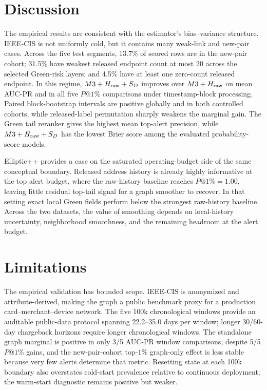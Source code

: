 \documentclass[11pt]{article}
\theoremstyle{definition}
\theoremstyle{remark}
\begin{document}
\section{Discussion}

The empirical results are consistent with the estimator's bias--variance structure. IEEE-CIS is not uniformly cold, but it contains many weak-link and new-pair cases. Across the five test segments, 13.7\% of scored rows are in the new-pair cohort; 31.5\% have weakest released endpoint count at most 20 across the selected Green-risk layers; and 4.5\% have at least one zero-count released endpoint. In this regime, $M3+H_{\rm raw}+S_D$ improves over $M3+H_{\rm raw}$ on mean AUC-PR and in all five $P@1\%$ comparisons under timestamp-block processing. Paired block-bootstrap intervals are positive globally and in both controlled cohorts, while released-label permutation sharply weakens the marginal gain. The Green tail reranker gives the highest mean top-alert precision, while $M3+H_{\rm raw}+S_D$ has the lowest Brier score among the evaluated probability-score models.

Elliptic++ provides a case on the saturated operating-budget side of the same conceptual boundary. Released address history is already highly informative at the top alert budget, where the raw-history baseline reaches $P@1\%=1.00$, leaving little residual top-tail signal for a graph smoother to recover. In that setting exact local Green fields perform below the strongest raw-history baseline. Across the two datasets, the value of smoothing depends on local-history uncertainty, neighborhood smoothness, and the remaining headroom at the alert budget.

\section{Limitations}

The empirical validation has bounded scope. IEEE-CIS is anonymized and attribute-derived, making the graph a public benchmark proxy for a production card--merchant--device network. The five 100k chronological windows provide an auditable public-data protocol spanning 22.2--35.0 days per window; longer 30/60-day chargeback horizons require longer chronological windows. The standalone graph marginal is positive in only 3/5 AUC-PR window comparisons, despite 5/5 $P@1\%$ gains, and the new-pair-cohort top-$1\%$ graph-only effect is less stable because very few alerts determine that metric. Resetting state at each 100k boundary also overstates cold-start prevalence relative to continuous deployment; the warm-start diagnostic remains positive but weaker.
\end{document}
